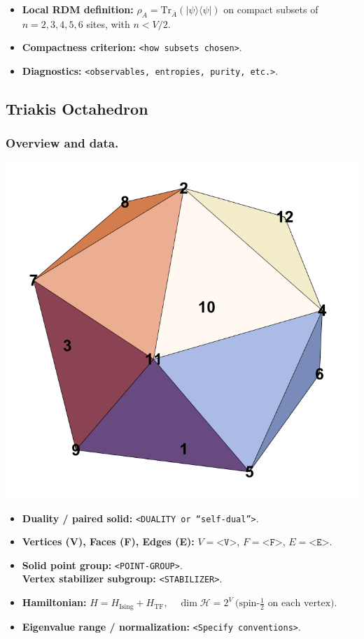 \documentclass[11pt,a4paper]{article}
\newcommand{\Hising}{H_{\mathrm{Ising}}}
\newcommand{\Htf}{H_{\mathrm{TF}}}
\newcommand{\Htot}{H=\Hising+\Htf}
\begin{document}
\begin{itemize}[leftmargin=1.5em]
  \item \textbf{Local RDM definition:} $\rho_A=\mathrm{Tr}_{\bar A}(|\psi\rangle\langle\psi|)$ on compact subsets of $n=2,3,4,5,6$ sites, with $n < V/2$.
  \item \textbf{Compactness criterion:} \texttt{<how subsets chosen>}.
  \item \textbf{Diagnostics:} \texttt{<observables, entropies, purity, etc.>}.
\end{itemize}


\subsection*{Triakis Octahedron}

\subsubsection*{Overview and data.}
\begin{center}
  \includegraphics[width=.6\linewidth]{icosahedron}
\end{center}

\begin{itemize}[leftmargin=1.5em]
  \item \textbf{Duality / paired solid:} \texttt{<DUALITY or “self-dual”>}.
  \item \textbf{Vertices (V), Faces (F), Edges (E):} $V=\texttt{<V>}$,\; $F=\texttt{<F>}$,\; $E=\texttt{<E>}$.
  \item \textbf{Solid point group:} \texttt{<POINT-GROUP>}.\\
        \textbf{Vertex stabilizer subgroup:} \texttt{<STABILIZER>}.
  \item \textbf{Hamiltonian:} \(
        \Htot,\quad
        \dim\mathcal{H} = 2^{V}\ \text{(spin-$\tfrac12$ on each vertex).}
        \)
  \item \textbf{Eigenvalue range / normalization:} \texttt{<Specify conventions>}.
\end{itemize}
\end{document}
